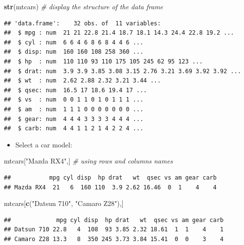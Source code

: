 \documentclass[]{article}
\def\tightlist{}
\newenvironment{Shaded}{\begin{snugshade}}{\end{snugshade}}
\newcommand{\KeywordTok}[1]{\textcolor[rgb]{0.13,0.29,0.53}{\textbf{{#1}}}}
\newcommand{\StringTok}[1]{\textcolor[rgb]{0.31,0.60,0.02}{{#1}}}
\newcommand{\CommentTok}[1]{\textcolor[rgb]{0.56,0.35,0.01}{\textit{{#1}}}}
\newcommand{\NormalTok}[1]{{#1}}
\numberwithin{equation}{section}
\begin{document}
\begin{Shaded}
\begin{Highlighting}[]
\KeywordTok{str}\NormalTok{(mtcars) }\CommentTok{# display the structure of the data frame}
\end{Highlighting}
\end{Shaded}

\begin{verbatim}
## 'data.frame':    32 obs. of  11 variables:
##  $ mpg : num  21 21 22.8 21.4 18.7 18.1 14.3 24.4 22.8 19.2 ...
##  $ cyl : num  6 6 4 6 8 6 8 4 4 6 ...
##  $ disp: num  160 160 108 258 360 ...
##  $ hp  : num  110 110 93 110 175 105 245 62 95 123 ...
##  $ drat: num  3.9 3.9 3.85 3.08 3.15 2.76 3.21 3.69 3.92 3.92 ...
##  $ wt  : num  2.62 2.88 2.32 3.21 3.44 ...
##  $ qsec: num  16.5 17 18.6 19.4 17 ...
##  $ vs  : num  0 0 1 1 0 1 0 1 1 1 ...
##  $ am  : num  1 1 1 0 0 0 0 0 0 0 ...
##  $ gear: num  4 4 4 3 3 3 3 4 4 4 ...
##  $ carb: num  4 4 1 1 2 1 4 2 2 4 ...
\end{verbatim}

\begin{itemize}
\tightlist
\item
  Select a car model:
\end{itemize}

\begin{Shaded}
\begin{Highlighting}[]
\NormalTok{mtcars[}\StringTok{"Mazda RX4"}\NormalTok{,] }\CommentTok{# using rows and columns names}
\end{Highlighting}
\end{Shaded}

\begin{verbatim}
##           mpg cyl disp  hp drat   wt  qsec vs am gear carb
## Mazda RX4  21   6  160 110  3.9 2.62 16.46  0  1    4    4
\end{verbatim}

\begin{Shaded}
\begin{Highlighting}[]
\NormalTok{mtcars[}\KeywordTok{c}\NormalTok{(}\StringTok{"Datsun 710"}\NormalTok{, }\StringTok{"Camaro Z28"}\NormalTok{),] }
\end{Highlighting}
\end{Shaded}

\begin{verbatim}
##             mpg cyl disp  hp drat   wt  qsec vs am gear carb
## Datsun 710 22.8   4  108  93 3.85 2.32 18.61  1  1    4    1
## Camaro Z28 13.3   8  350 245 3.73 3.84 15.41  0  0    3    4
\end{verbatim}
\end{document}
